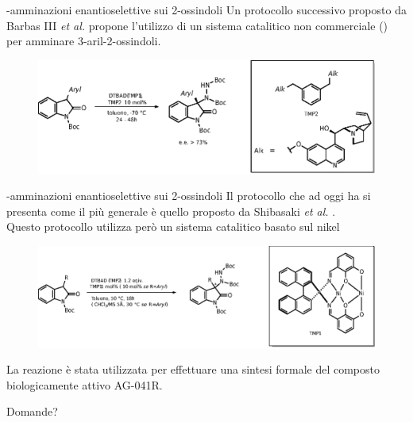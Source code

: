 \documentclass[10pt]{beamer}
\begin{document}
\begin{frame}[fragile]{{\textalpha}-amminazioni enantioselettive sui 2-ossindoli}
Un protocollo successivo proposto da Barbas III \textit{et al.}  propone l'utilizzo di un sistema catalitico non commerciale () per amminare \alert{3-aril-2-ossindoli}.
\begin{figure}[H] 
	\centering
	\includegraphics[scale=0.7]{P_barbas2oaaa.eps}
\end{figure} 
\end{frame}

\begin{frame}[fragile]{{\textalpha}-amminazioni enantioselettive sui 2-ossindoli}
Il protocollo che ad oggi ha si presenta come il più generale è quello proposto da Shibasaki \textit{et al.} .\\
Questo protocollo utilizza però un \alert{sistema catalitico basato sul nikel}
\begin{figure}[H] 
	\centering
	\includegraphics[scale=0.7]{P_shibasakioaaa.eps}
\end{figure} 
La reazione è stata utilizzata per effettuare una sintesi formale del composto biologicamente attivo \alert{AG-041R}.
\end{frame}


\begin{frame}[standout]
  Domande?
\end{frame}
\end{document}
